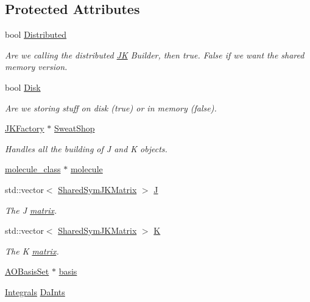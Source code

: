 \subsection*{Protected Attributes}
\begin{DoxyCompactItemize}
\item 
bool \hyperlink{classJKBuilder_1_1JK_a072479da68be17a25570325316eade23}{Distributed}
\begin{DoxyCompactList}\small\item\em Are we calling the distributed \hyperlink{classJKBuilder_1_1JK}{JK} Builder, then true. False if we want the shared memory version. \item\end{DoxyCompactList}\item 
bool \hyperlink{classJKBuilder_1_1JK_a6324fcb7d27b80663a26f90a35f2e9b9}{Disk}
\begin{DoxyCompactList}\small\item\em Are we storing stuff on disk (true) or in memory (false). \item\end{DoxyCompactList}\item 
\hyperlink{classJKBuilder_1_1JKFactory}{JKFactory} $\ast$ \hyperlink{classJKBuilder_1_1JK_a09e4ffeb9ba2c95bf981da66beecc033}{SweatShop}
\begin{DoxyCompactList}\small\item\em Handles all the building of J and K objects. \item\end{DoxyCompactList}\item 
\hyperlink{classJKBuilder_1_1molecule__class}{molecule\_\-class} $\ast$ \hyperlink{classJKBuilder_1_1JK_ad646bdee4fc9f601f954b4a98c4da476}{molecule}
\item 
std::vector$<$ \hyperlink{namespaceJKBuilder_aef21bc37b7cf7bc5ebb5a48628db8d0f}{SharedSymJKMatrix} $>$ \hyperlink{classJKBuilder_1_1JK_aa04a91cc219b5dabfce19d5316f96887}{J}
\begin{DoxyCompactList}\small\item\em The J \hyperlink{classJKBuilder_1_1matrix}{matrix}. \item\end{DoxyCompactList}\item 
std::vector$<$ \hyperlink{namespaceJKBuilder_aef21bc37b7cf7bc5ebb5a48628db8d0f}{SharedSymJKMatrix} $>$ \hyperlink{classJKBuilder_1_1JK_a5160b673d25f0110d98097f8e7364315}{K}
\begin{DoxyCompactList}\small\item\em The K \hyperlink{classJKBuilder_1_1matrix}{matrix}. \item\end{DoxyCompactList}\item 
\hyperlink{classJKBuilder_1_1AOBasisSet}{AOBasisSet} $\ast$ \hyperlink{classJKBuilder_1_1JK_a81392b84b45d3cf84c5c105e9fd5d09c}{basis}
\item 
\hyperlink{classJKBuilder_1_1Integrals}{Integrals} \hyperlink{classJKBuilder_1_1JK_ad95ede2076c192d856848b3635efc38e}{DaInts}
\end{DoxyCompactItemize}


